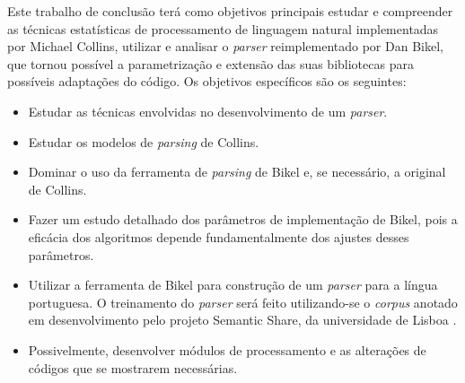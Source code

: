 Este trabalho de conclusão terá como objetivos principais estudar e compreender as técnicas estatísticas de processamento de linguagem natural implementadas por Michael Collins, utilizar e analisar o \emph{parser} reimplementado por Dan Bikel, que tornou possível a parametrização e extensão das suas bibliotecas para possíveis adaptações do código. Os objetivos específicos são os seguintes:

\begin{itemize}
	\item Estudar as técnicas envolvidas no desenvolvimento de um \emph{parser}.
	\item Estudar os modelos de \emph{parsing} de Collins.
	\item Dominar o uso da ferramenta de \emph{parsing} de Bikel e, se necessário, a original de Collins.
	\item Fazer um estudo detalhado dos parâmetros de implementação de Bikel, pois a eficácia dos algoritmos depende fundamentalmente dos ajustes desses parâmetros.
	\item Utilizar a ferramenta de Bikel para construção de um \emph{parser} para a língua portuguesa. O treinamento do \emph{parser} será feito utilizando-se o \emph{corpus} anotado em desenvolvimento pelo projeto Semantic Share, da universidade de Lisboa \cite{semanticshare}.
	\item Possivelmente, desenvolver módulos de processamento e as alterações de códigos que se mostrarem necessárias.
\end{itemize}



